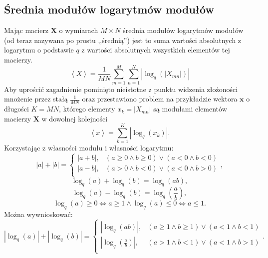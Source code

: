 \documentclass[pl,12pt]{aghdpl}
\let\Oldsubsection\subsection%
\renewcommand{\subsection}{\FloatBarrier\Oldsubsection}
\begin{document}
\subsection{Średnia modułów logarytmów modułów}
Mając macierz $\bm X$ o wymiarach $M \times N$ średnia modułów logarytmów modułów
(od teraz nazywana po prostu ,,średnią'') jest to suma wartości absolutnych z
logarytmu o podstawie $q$ z wartości absolutnych wszystkich elementów tej
macierzy.
\begin{equation}
  \left<X\right> =
  \frac{1}{MN}\sum_{m=1}^{M}\sum_{n=1}^{N}\left|\log_{q}\left(\left|X_{mn}\right|\right)\right|
\end{equation}
Aby uprościć zagadnienie pominięto nieistotne z punktu widzenia złożoności
mnożenie przez stałą $\frac{1}{MN}$ oraz przestawiono problem na przykładzie
wektora $\bm x$ o długości $K=MN$, którego elementy $x_k = \left|X_{mn}\right|$
są modułami elementów macierzy $\bm X$  w dowolnej kolejności
\begin{equation}\label{eq:naive_algorithm}
  \left<x\right> = \sum_{k=1}^{K}\left|\log_{q}\left(x_{k}\right)\right|.
\end{equation}
Korzystając z własności modułu i własności logarytmu:
\begin{equation}
  |a| + |b| = \begin{cases}
    |a + b|, & (a \geq 0 \land b \geq 0) \lor (a < 0 \land b < 0)\\
    |a - b|, & (a > 0 \land b < 0) \lor (a < 0 \land b > 0)\\
  \end{cases},
\end{equation}
\begin{equation}
  \log_q(a) + \log_q(b) = \log_q(ab),
\end{equation}
\begin{equation}
  \log_q(a) - \log_q(b) = \log_q\left(\frac{a}{b}\right),
\end{equation}
\begin{equation}
  \log_q(a) \geq 0 \iff a \geq 1 \land \log_q(a) \leq 0 \iff a \leq 1 .
\end{equation}
Można wywnioskować:
\begin{equation}
  |\log_q(a)| + |\log_q(b)| = \begin{cases}
    |\log_q(ab)|, & (a \geq 1 \land b \geq 1) \lor (a < 1 \land b < 1)\\
    |\log_q\left(\frac{a}{b}\right)|, & (a > 1 \land b < 1) \lor (a < 1 \land b > 1)\\
  \end{cases}.
\end{equation}
\end{document}
